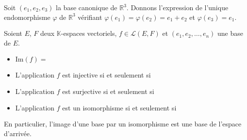 \documentclass[a4paper,10pt]{report}
\begin{document}
\begin{Exemple} Soit $(e_1, e_2, e_3)$ la base canonique de $\mathbb{R}^3$. Donnons l'expression de l'unique endomorphisme $\varphi$ de $\mathbb{R}^3$ vérifiant $\varphi(e_1)= \varphi(e_2)= e_1+e_2$ et $\varphi(e_3)=e_1$.

\vspace{8cm}
\end{Exemple}

\begin{Theoreme}{} Soient $E$, $F$ deux $\mathbb{K}$-espaces vectoriels, $f \in \mathcal{L}(E,F)$ et $(e_1, e_2, \ldots, e_n)$ une base de $E$.

\begin{itemize}
\item $\textrm{Im}(f) = \phantom{\textrm{Vect}(f(e_1), f(e_2), \ldots, f(e_n))}$
\item L'application $f$ est injective si et seulement si \phantom{$(f(e_1), f(e_2), \ldots, f(e_n))$ est une famille libre.}
\item L'application $f$ est surjective si et seulement si \phantom{$(f(e_1), f(e_2), \ldots, f(e_n))$ est une famille génératrice de $F$.}
\item L'application $f$ est un isomorphisme si et seulement si \phantom{$(f(e_1), f(e_2), \ldots, f(e_n))$ est une base.}
\end{itemize}
\end{Theoreme}

\begin{Remarque}{} En particulier, l'image d'une base par un isomorphisme est une base de l'espace d'arrivée.
\end{Remarque}
\end{document}
